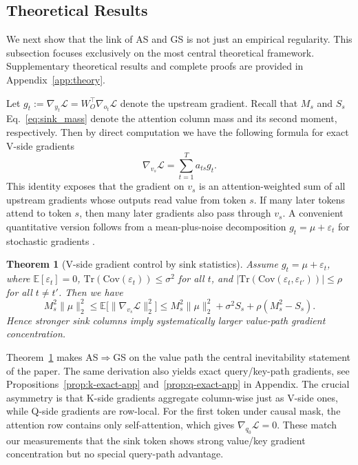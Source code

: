 \documentclass{article}
\theoremstyle{plain}
\newtheorem{theorem}{Theorem}
\theoremstyle{definition}
\theoremstyle{remark}
\begin{document}
\subsection{Theoretical Results}\label{subsec:theory_as_to_gs}
We next show that the link of AS and GS is not just an empirical regularity.
This subsection focuses exclusively on the most central theoretical framework. Supplementary theoretical results and complete proofs are provided in Appendix~\ref{app:theory}.

Let $g_t := \nabla_{y_t}\mathcal{L} = W_O^\top \nabla_{o_t}\mathcal{L}$ denote the upstream gradient. Recall that $M_s$ and $S_s$ Eq.~\eqref{eq:sink_mass} denote the attention column mass and its second moment, respectively. Then by direct computation we have the following formula for exact V-side gradients
\[
\nabla_{v_s}\mathcal{L}
=
\sum_{t=1}^{T} a_{ts} g_t .
\]
This identity exposes that the gradient on $v_s$ is an attention-weighted sum of all upstream gradients whose outputs read value from token $s$. If many later tokens attend to token $s$, then many later gradients also pass through $v_s$. A convenient quantitative version follows from a mean-plus-noise decomposition $g_t = \mu + \varepsilon_t$ for stochastic gradients \citep{mandt2017sgd, mccandlish2018noise}.

\begin{theorem}[V-side gradient control by sink statistics]\label{thm:v_second_moment_main}
Assume $g_t = \mu + \varepsilon_t$, where $\mathbb{E}[\varepsilon_t]=0$, $\mathrm{Tr}(\mathrm{Cov}(\varepsilon_t)) \le \sigma^2$ for all $t$, and $|\mathrm{Tr}(\mathrm{Cov}(\varepsilon_t,\varepsilon_{t'}))| \le \rho$ for all $t \ne t'$. Then we have
\[
M_s^2\|\mu\|_2^2
\le
\mathbb{E}\big[\|\nabla_{v_s}\mathcal{L}\|_2^2\big]
\le
M_s^2\|\mu\|_2^2 + \sigma^2 S_s + \rho(M_s^2 - S_s).
\]
Hence stronger sink columns imply systematically larger value-path gradient concentration.
\end{theorem}

Theorem~\ref{thm:v_second_moment_main} makes AS$\Rightarrow$GS on the value path the central inevitability statement of the paper. The same derivation also yields exact query/key-path gradients, see Propositions~\ref{prop:k-exact-app} and~\ref{prop:q-exact-app} in Appendix.
The crucial asymmetry is that K-side gradients aggregate column-wise just as V-side ones, while Q-side gradients are row-local.
For the first token under causal mask, the attention row contains only self-attention, which gives $\nabla_{q_0}\mathcal{L} = 0$. These match our measurements that the sink token shows strong value/key gradient concentration but no special query-path advantage.
\end{document}

